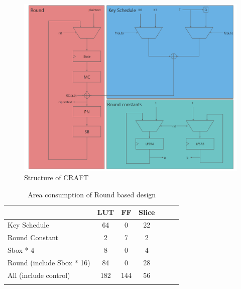 \documentclass[sn-basic]{sn-jnl}%
\begin{document}
\begin{figure}[h]%
    \caption{Structure of CRAFT}\label{fig2}
    \centering
    \includegraphics[width=\textwidth]{round_based_design.png}
\end{figure}

\begin{table}[h]
    \caption{Area consumption of Round based design}\label{tab2}%
    \begin{tabular*}{\textwidth}{@{\extracolsep\fill}lcccccc}
        \toprule
        &LUT&	FF&	Slice                                \\
        \midrule
        Key Schedule &	64&	0&	22                           \\
        Round Constant&	2&	7&	2 \\
        Sbox * 4&	8&	0&	4                             \\
        Round (include  Sbox * 16)&	84&	0&	28                        \\
        All (include control)&	182&	144&	56                     \\
        \botrule
    \end{tabular*}
\end{table}
\end{document}
